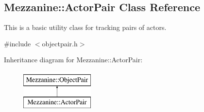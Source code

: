 \hypertarget{classMezzanine_1_1ActorPair}{
\subsection{Mezzanine::ActorPair Class Reference}
\label{classMezzanine_1_1ActorPair}
}


This is a basic utility class for tracking pairs of actors.  




{\ttfamily \#include $<$objectpair.h$>$}

Inheritance diagram for Mezzanine::ActorPair:\begin{figure}[H]
\begin{center}
\leavevmode
\includegraphics[height=2.000000cm]{classMezzanine_1_1ActorPair}
\end{center}
\end{figure}
